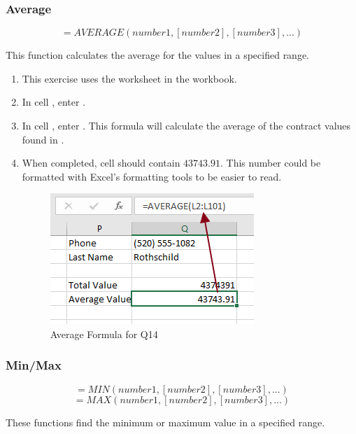 \subsubsection{Average}

\[ =AVERAGE(number1, [number2], [number3], ...) \]

This function calculates the average for the values in a specified range. 

\begin{enumbox}
	\begin{enumerate}
		\item This exercise uses the  worksheet in the  workbook.
		\item In cell , enter .
		\item In cell , enter . This formula will calculate the average of the contract values found in .
		\item When completed, cell  should contain $ 43743.91 $. This number could be formatted with Excel's formatting tools to be easier to read.
	
		\begin{figure}[H]
			\centering
			\includegraphics[width=\maxwidth{.75\linewidth}]{gfx/ch09_fig39}
			\caption{Average Formula for Q14}
			\label{09:fig39}
		\end{figure}
	
	\end{enumerate}
\end{enumbox}
	
\subsubsection{Min/Max}

\[ =MIN(number1, [number2], [number3], ...) \]
\[ =MAX(number1, [number2], [number3], ...) \]

These functions find the minimum or maximum value in a specified range. 

